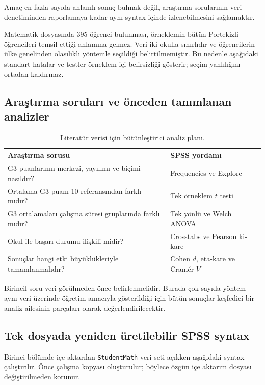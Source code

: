 Amaç en fazla sayıda anlamlı sonuç bulmak değil, araştırma sorularının veri
denetiminden raporlamaya kadar aynı syntax içinde izlenebilmesini sağlamaktır.

\begin{researchbox}
Matematik dosyasında 395 öğrenci bulunması, örneklemin bütün Portekizli
öğrencileri temsil ettiği anlamına gelmez. Veri iki okulla sınırlıdır ve
öğrencilerin ülke genelinden olasılıklı yöntemle seçildiği belirtilmemiştir.
Bu nedenle aşağıdaki standart hatalar ve testler örneklem içi belirsizliği
gösterir; seçim yanlılığını ortadan kaldırmaz.
\end{researchbox}

\subsection{Araştırma soruları ve önceden tanımlanan analizler}

\begin{table}[htbp]
\centering
\caption{Literatür verisi için bütünleştirici analiz planı.}
\begin{tabular}{@{}p{}p{}@{}}
\toprule
Araştırma sorusu & SPSS yordamı \\
\midrule
G3 puanlarının merkezi, yayılımı ve biçimi nasıldır? & Frequencies ve Explore \\
Ortalama G3 puanı 10 referansından farklı mıdır? & Tek örneklem $t$ testi \\
G3 ortalamaları çalışma süresi gruplarında farklı mıdır? & Tek yönlü ve Welch ANOVA \\
Okul ile başarı durumu ilişkili midir? & Crosstabs ve Pearson ki-kare \\
Sonuçlar hangi etki büyüklükleriyle tamamlanmalıdır? & Cohen $d$, eta-kare ve Cramér $V$ \\
\bottomrule
\end{tabular}
\end{table}

Birincil soru veri görülmeden önce belirlenmelidir. Burada çok sayıda yöntem
aynı veri üzerinde öğretim amacıyla gösterildiği için bütün sonuçlar
keşfedici bir analiz ailesinin parçaları olarak değerlendirilecektir.

\subsection{Tek dosyada yeniden üretilebilir SPSS syntax}

Birinci bölümde içe aktarılan \texttt{StudentMath} veri seti açıkken aşağıdaki
syntax çalıştırılır. Önce çalışma kopyası oluşturulur; böylece özgün içe
aktarım dosyası değiştirilmeden korunur.

